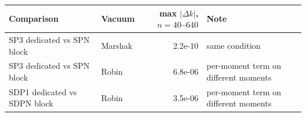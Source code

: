 \begin{tabular}{llrl}
\hline
Comparison & Vacuum & max $|\Delta k|$, $n=40$--$640$ & Note \\
\hline
SP3 dedicated vs SPN block & Marshak & 2.2e-10 & same condition \\
SP3 dedicated vs SPN block & Robin & 6.8e-06 & per-moment term on different moments \\
SDP1 dedicated vs SDPN block & Robin & 3.5e-06 & per-moment term on different moments \\
\hline
\end{tabular}
